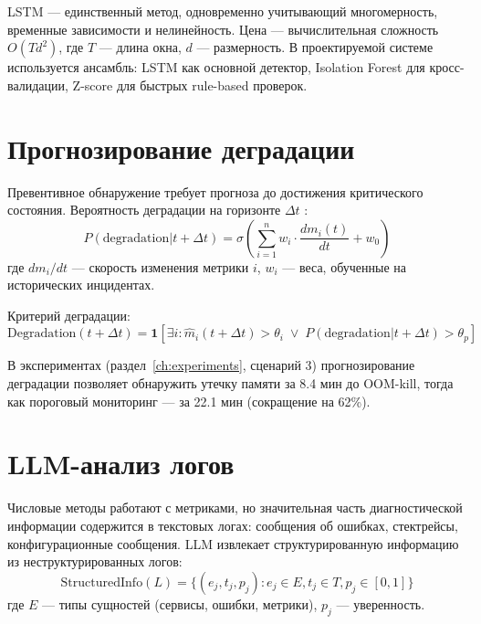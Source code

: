 LSTM --- единственный метод, одновременно учитывающий многомерность, временные зависимости и нелинейность. Цена --- вычислительная сложность $O(Td^2)$, где $T$ --- длина окна, $d$ --- размерность. В проектируемой системе используется ансамбль: LSTM как основной детектор, Isolation Forest для кросс-валидации, Z-score для быстрых rule-based проверок.

\section{Прогнозирование деградации}

Превентивное обнаружение требует прогноза до достижения критического состояния. Вероятность деградации на горизонте $\Delta t$ \cite{hastie_elements,bishop_pattern_recognition}:
\begin{equation}
P(\text{degradation}|t+\Delta t) = \sigma\left(\sum_{i=1}^{n} w_i \cdot \frac{dm_i(t)}{dt} + w_0\right)
\label{eq:degradation_prediction}
\end{equation}
где $dm_i/dt$ --- скорость изменения метрики $i$, $w_i$ --- веса, обученные на исторических инцидентах.

Критерий деградации:
\begin{equation}
\text{Degradation}(t+\Delta t) = \mathbf{1}[\exists i: \hat{m}_i(t+\Delta t) > \theta_i \;\lor\; P(\text{degradation}|t+\Delta t) > \theta_p]
\label{eq:degradation_criterion}
\end{equation}

В экспериментах (раздел~\ref{ch:experiments}, сценарий 3) прогнозирование деградации позволяет обнаружить утечку памяти за 8.4 мин до OOM-kill, тогда как пороговый мониторинг --- за 22.1 мин (сокращение на 62\%).

\section{LLM-анализ логов}

Числовые методы работают с метриками, но значительная часть диагностической информации содержится в текстовых логах: сообщения об ошибках, стектрейсы, конфигурационные сообщения. LLM \cite{vaswani_attention} извлекает структурированную информацию из неструктурированных логов:
\begin{equation}
\text{StructuredInfo}(L) = \{(e_j, t_j, p_j) : e_j \in E, t_j \in T, p_j \in [0, 1]\}
\label{eq:llm_extraction}
\end{equation}
где $E$ --- типы сущностей (сервисы, ошибки, метрики), $p_j$ --- уверенность.

